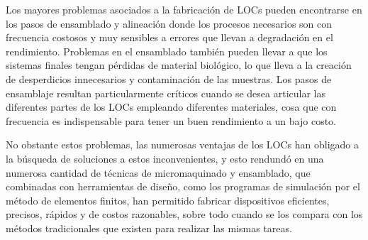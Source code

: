 \documentclass[a4paper, 12pt]{article}
\begin{document}
Los mayores problemas asociados a la fabricación de LOCs pueden encontrarse en los pasos de ensamblado y alineación donde los procesos necesarios son con frecuencia costosos y muy sensibles a errores que llevan a degradación en el rendimiento. Problemas en el ensamblado también pueden llevar a que los sistemas finales tengan pérdidas de material biológico, lo que lleva a la creación de desperdicios innecesarios y contaminación de las muestras. Los pasos de ensamblaje resultan particularmente críticos cuando se desea articular las diferentes partes de los LOCs empleando diferentes materiales, cosa que con frecuencia es indispensable para tener un buen rendimiento a un bajo costo.

No obstante estos problemas, las numerosas ventajas de los LOCs han obligado a la búsqueda de soluciones a estos inconvenientes, y esto rendundó en una numerosa cantidad de técnicas de micromaquinado y ensamblado, que combinadas con herramientas de diseño, como los programas de simulación por el método de elementos finitos, han permitido fabricar dispositivos eficientes, precisos, rápidos y de costos razonables, sobre todo cuando se los compara con los métodos tradicionales que existen para realizar las mismas tareas.


\end{document}
